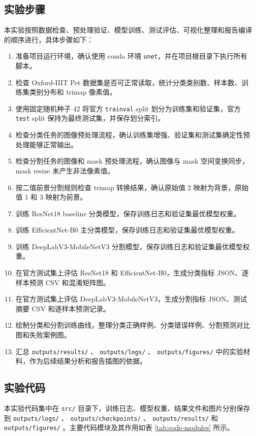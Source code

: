 \documentclass[UTF8,a4paper,12pt]{ctexart}
\newcommand{\code}[1]{%
  \begingroup
  \def\UrlFont{\ttfamily}%
  \nolinkurl{#1}%
  \endgroup
}
\begin{document}
\subsection{实验步骤}

本实验按照数据检查、预处理验证、模型训练、测试评估、可视化整理和报告编译的顺序进行，具体步骤如下：

\begin{enumerate}
  \item 准备项目运行环境，确认使用 conda 环境 \texttt{unet}，并在项目根目录下执行所有脚本。
  \item 检查 Oxford-IIIT Pet 数据集是否可正常读取，统计分类类别数、样本数、训练集类别分布和 trimap 像素值。
  \item 使用固定随机种子 42 将官方 \texttt{trainval} split 划分为训练集和验证集，官方 \texttt{test} split 保持为最终测试集，并保存划分索引。
  \item 检查分类任务的图像预处理流程，确认训练集增强、验证集和测试集确定性预处理能够正常输出。
  \item 检查分割任务的图像和 mask 预处理流程，确认图像与 mask 空间变换同步，mask resize 未产生非法像素值。
  \item 按二值前景分割规则检查 trimap 转换结果，确认原始值 2 映射为背景，原始值 1 和 3 映射为前景。
  \item 训练 ResNet18 baseline 分类模型，保存训练日志和验证集最优模型权重。
  \item 训练 EfficientNet-B0 主分类模型，保存训练日志和验证集最优模型权重。
  \item 训练 DeepLabV3-MobileNetV3 分割模型，保存训练日志和验证集最优模型权重。
  \item 在官方测试集上评估 ResNet18 和 EfficientNet-B0，生成分类指标 JSON、逐样本预测 CSV 和混淆矩阵图。
  \item 在官方测试集上评估 DeepLabV3-MobileNetV3，生成分割指标 JSON、测试摘要 CSV 和逐样本预测记录。
  \item 绘制分类和分割训练曲线，整理分类正确样例、分类错误样例、分割预测对比图和失败案例图。
  \item 汇总 \code{outputs/results/}、\code{outputs/logs/}、\code{outputs/figures/} 中的实验材料，作为后续结果分析和报告插图的依据。
\end{enumerate}

\subsection{实验代码}

本实验代码集中在 \code{src/} 目录下，训练日志、模型权重、结果文件和图片分别保存到 \code{outputs/logs/}、\code{outputs/checkpoints/}、\code{outputs/results/} 和 \code{outputs/figures/}。主要代码模块及其作用如表 \ref{tab:code-modules} 所示。
\end{document}
